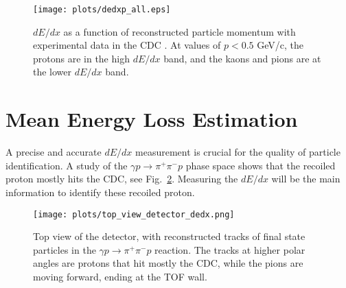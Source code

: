 \begin{figure}[H]
    \centering
    \texttt{[image: plots/dedxp\_all.eps]}
    \caption{\label{fig.3.1}$dE/dx$ as a function of reconstructed particle momentum with experimental data in the CDC . At values of $p<0.5$ GeV/c, the protons are in the high $dE/dx$ band, and the kaons and pions are at the lower $dE/dx$ band.}
\end{figure}

\section{Mean Energy Loss Estimation}
\label{p.3.2}

A precise and accurate $dE/dx$ measurement is crucial for the quality of particle identification. A study of the $\gamma p \rightarrow \pi^{+} \pi^{-} p$ phase space shows that the recoiled proton mostly hits the CDC, see Fig.~\ref{fig.3.2}.
Measuring the $dE/dx$ will be the main information to identify these recoiled proton.

\begin{figure}[H]
    \centering
    \texttt{[image: plots/top\_view\_detector\_dedx.png]}
    \caption{\label{fig.3.2}Top view of the detector, with reconstructed tracks of final state particles in the $\gamma p \rightarrow \pi^{+} \pi^{-} p$ reaction. The tracks at higher polar angles are protons that hit mostly the CDC, while the pions are moving forward, ending at the TOF wall.}
\end{figure}

